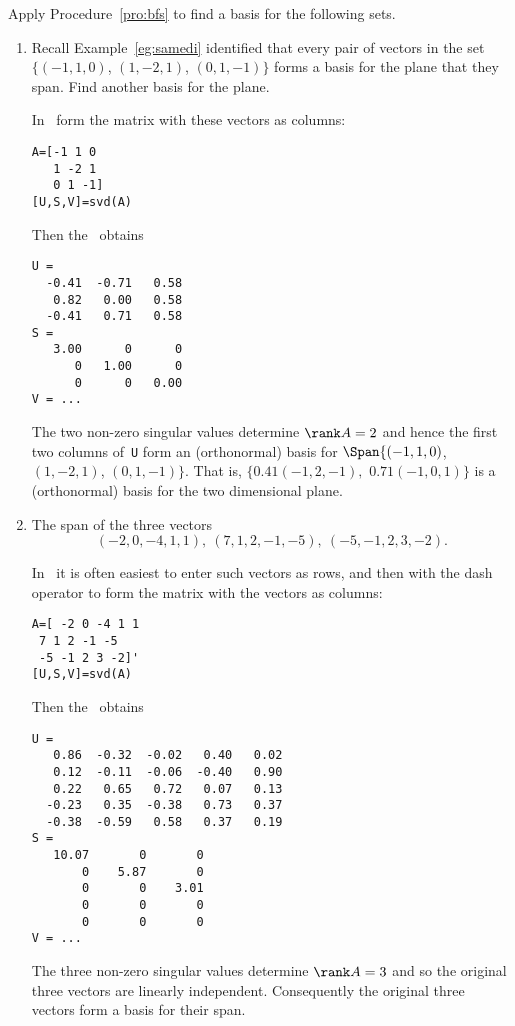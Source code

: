 \begin{example} \label{eg:}
Apply Procedure~\ref{pro:bfs} to find a basis for the following sets.
\begin{enumerate}
\item Recall Example~\ref{eg:samedi} identified that every pair of vectors in the set \(\{(-1,1,0)\), \((1,-2,1)\), \((0,1,-1)\}\) forms a basis for the plane that they span.  
Find another basis for the plane.
\begin{solution} 
In \script\ form the matrix with these vectors as columns:
\begin{verbatim}
A=[-1 1 0
   1 -2 1
   0 1 -1]
[U,S,V]=svd(A)
\end{verbatim}
\setbox\ajrqrbox\hbox{}%
\marginpar{\usebox{\ajrqrbox}}%
Then the \svd\  obtains \twodp
\begin{verbatim}
U =
  -0.41  -0.71   0.58
   0.82   0.00   0.58
  -0.41   0.71   0.58
S =
   3.00      0      0
      0   1.00      0
      0      0   0.00
V = ...
\end{verbatim}
The two non-zero singular values determine \(\rank A=2\) and hence the first two columns of~\verb|U| form an (orthonormal) basis for \(\Span\{(-1,1,0)\), \((1,-2,1)\), \((0,1,-1)\}\).
That is, \(\{0.41(-1,2,-1),\) \(0.71(-1,0,1)\}\) is a (orthonormal) basis for the two dimensional plane.
\end{solution}

\item The span of the three vectors
\begin{equation*}
(-2,0,-4,1,1),\ 
(7,1,2,-1,-5),\ 
(-5,-1,2,3,-2).
\end{equation*}
\begin{solution} 
In \script\ it is often easiest to enter such vectors as rows, and then  with the dash operator to form the matrix with the vectors as columns:
\begin{verbatim}
A=[ -2 0 -4 1 1
 7 1 2 -1 -5
 -5 -1 2 3 -2]'
[U,S,V]=svd(A)
\end{verbatim}
\setbox\ajrqrbox\hbox{}%
\marginpar{\usebox{\ajrqrbox}}%
Then the \svd\ obtains \twodp
\begin{verbatim}
U =
   0.86  -0.32  -0.02   0.40   0.02
   0.12  -0.11  -0.06  -0.40   0.90
   0.22   0.65   0.72   0.07   0.13
  -0.23   0.35  -0.38   0.73   0.37
  -0.38  -0.59   0.58   0.37   0.19
S =
   10.07       0       0
       0    5.87       0
       0       0    3.01
       0       0       0
       0       0       0
V = ...
\end{verbatim}
The three non-zero singular values determine  \(\rank A=3\) and so the original three vectors are linearly independent.
Consequently the original three vectors form a basis for their span.


\end{solution}
\end{enumerate}
\end{example}
